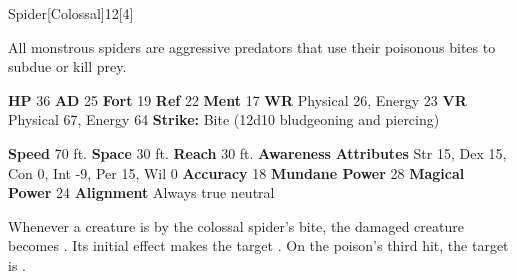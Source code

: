   
  \begin{monsection}{Spider}[Colossal]{12}[4]
    \vspace{-1em}\vspace{-1em}
    \vspace{0em}

    
    All monstrous spiders are aggressive predators that use their poisonous bites to subdue or kill prey.
  
    

    \begin{spellcontent}
      \begin{spelltargetinginfo}
        \pari \textbf{HP} 36 \monsep
          \textbf{AD} 25 \monsep
          \textbf{Fort} 19 \monsep
          \textbf{Ref} 22 \monsep
          \textbf{Ment} 17
        \pari \textbf{WR} Physical 26, Energy 23 \monsep
        \textbf{VR} Physical 67, Energy 64
        \pari \textbf{Strike:}
            Bite  (12d10 bludgeoning and piercing)
      \end{spelltargetinginfo}
    \end{spellcontent}
    \begin{monsterfooter}
      \pari \textbf{Speed} 70 ft. \monsep
        \textbf{Space} 30 ft. \monsep
        \textbf{Reach} 30 ft.
      \pari \textbf{Awareness} 
      \pari \textbf{Attributes}
        Str 15, Dex 15,
        Con 0, Int -9,
        Per 15, Wil 0
      \pari \textbf{Accuracy} 18 \monsep
        \textbf{Mundane Power} 28 \monsep
      \textbf{Magical Power} 24
      \pari \textbf{Alignment} Always true neutral
    \end{monsterfooter}
  \end{monsection}
    Whenever a creature is  by the colossal spider's bite,
      the damaged creature becomes .
    Its initial effect makes the target .
    On the poison's third hit, the target is .
  
